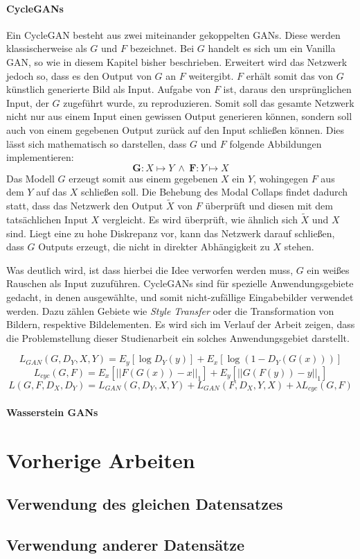 \paragraph{CycleGANs}
Ein \ac{CycleGAN} besteht aus zwei miteinander gekoppelten \acp{GAN}. Diese werden klassischerweise als $G$ und $F$ bezeichnet. Bei $G$ handelt es sich um ein Vanilla \ac{GAN}, so wie in diesem Kapitel bisher beschrieben. Erweitert wird das Netzwerk jedoch so, dass es den Output von $G$ an $F$ weitergibt. $F$ erhält somit das von $G$ künstlich generierte Bild als Input. Aufgabe von $F$ ist, daraus den ursprünglichen Input, der $G$ zugeführt wurde, zu reproduzieren. Somit soll das gesamte Netzwerk nicht nur aus einem Input einen gewissen Output generieren können, sondern soll auch von einem gegebenen Output zurück auf den Input schließen können. Dies lässt sich mathematisch so darstellen, dass $G$ und $F$ folgende Abbildungen implementieren:
\begin{equation}
	\mathbf{G}: X\mapsto Y \: \wedge \: \mathbf{F}: Y\mapsto X
\end{equation}
Das Modell $G$ erzeugt somit aus einem gegebenen $X$ ein $Y$, wohingegen $F$ aus dem $Y$ auf das $X$ schließen soll. Die Behebung des Modal Collaps findet dadurch statt, dass das Netzwerk den Output $\tilde{X}$ von $F$ überprüft und diesen mit dem tatsächlichen Input $X$ vergleicht. Es wird überprüft, wie ähnlich sich $\tilde{X}$ und $X$ sind. Liegt eine zu hohe Diskrepanz vor, kann das Netzwerk darauf schließen, dass $G$ Outputs erzeugt, die nicht in direkter Abhängigkeit zu $X$ stehen. 

Was deutlich wird, ist dass hierbei die Idee verworfen werden muss, $G$ ein weißes Rauschen als Input zuzuführen. \acp{CycleGAN} sind für spezielle Anwendungsgebiete gedacht, in denen ausgewählte, und somit nicht-zufällige Eingabebilder verwendet werden. Dazu zählen Gebiete wie \emph{Style Transfer} oder die Transformation von Bildern, respektive Bildelementen. Es wird sich im Verlauf der Arbeit zeigen, dass die Problemstellung dieser Studienarbeit ein solches Anwendungsgebiet darstellt.

\begin{equation}
	L_{GAN}(G, D_Y, X, Y) = E_y[\log{D_Y(y)}] + E_x[\log(1-D_Y(G(x)))]
\end{equation}
\begin{equation}
	L_{cyc}(G, F) = E_x[||F(G(x))-x||_1] + E_y[||G(F(y))-y||_1]
\end{equation}
\begin{equation}
	L(G, F, D_X, D_Y) = L_{GAN}(G, D_Y, X, Y) + L_{GAN}(F, D_X, Y, X) + \lambda L_{cyc}(G, F)
\end{equation}
\cite{cycleGAN}
\paragraph{Wasserstein GANs}

\cite{Goodfellow-et-al-2016}
\cite{visualApproach}
\section{Vorherige Arbeiten}
\subsection{Verwendung des gleichen Datensatzes}
\cite{gtsrbGAN}
\subsection{Verwendung anderer Datensätze}
\cite{taiwanGAN}